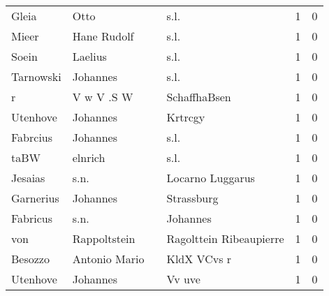 \begin{center}
\begin{tiny}
\begin{longtabu}{llllrr}
                    Gleia &                               Otto &             &                                        s.l. &          1 &         0 \\
                    Mieer &                        Hane Rudolf &             &                                        s.l. &          1 &         0 \\
                    Soein &                            Laelius &             &                                        s.l. &          1 &         0 \\
                Tarnowski &                           Johannes &             &                                        s.l. &          1 &         0 \\
                        r &                         V w V .S W &             &                                SchaffhaBsen &          1 &         0 \\
                 Utenhove &                           Johannes &             &                                     Krtrcgy &          1 &         0 \\
                 Fabrcius &                           Johannes &             &                                        s.l. &          1 &         0 \\
                     taBW &                            elnrich &             &                                        s.l. &          1 &         0 \\
                  Jesaias &                               s.n. &             &                            Locarno Luggarus &          1 &         0 \\
                Garnerius &                           Johannes &             &                                  Strassburg &          1 &         0 \\
                 Fabricus &                               s.n. &             &                                    Johannes &          1 &         0 \\
                      von &                       Rappoltstein &             &                     Ragolttein Ribeaupierre &          1 &         0 \\
                  Besozzo &                      Antonio Mario &             &                                 KldX VCvs r &          1 &         0 \\
                 Utenhove &                           Johannes &             &                                      Vv uve &          1 &         0 \\

\end{longtabu}
\end{tiny}
\end{center}
